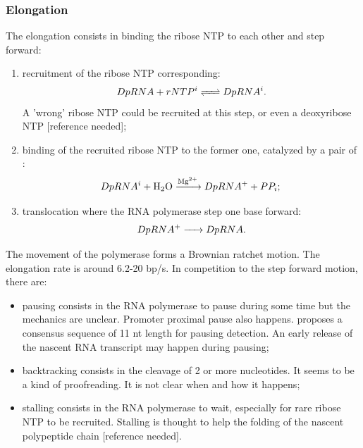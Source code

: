 \subsubsection{Elongation}
The elongation consists in binding the ribose NTP to each other and step forward:
\begin{enumerate}
  \item recruitment of the ribose NTP corresponding:
    $$
      \reactionRev{DpRNA + rNTP^i}{DpRNA^i}{}{} . \\
    $$
    A 'wrong' ribose NTP could be recruited at this step, or even a deoxyribose NTP [reference needed];
  \item binding of the recruited ribose NTP to the former one, catalyzed by a pair of :
    $$
      \reactionIrr{DpRNA^i + \ce{H2O}}{DpRNA^+ + PP_i}{\ce{Mg^2+}}{} ; \\
    $$
  \item translocation where the RNA polymerase step one base forward:
    $$
      \reactionIrr{DpRNA^+}{DpRNA}{}{} . \\
    $$
\end{enumerate}
The movement of the polymerase forms a Brownian ratchet motion. The elongation rate is around 6.2-20 bp/s. In competition to the step forward motion, there are:
\begin{itemize}
  \item pausing consists in the RNA polymerase to pause during some time but the mechanics are unclear. Promoter proximal pause also happens. \citep{LaW+:14} proposes a consensus sequence of 11 nt length for pausing detection. An early release of the nascent RNA transcript may happen during pausing;
  \item backtracking consists in the cleavage of 2 or more nucleotides. It seems to be a kind of proofreading. It is not clear when and how it happens;
  \item stalling consists in the RNA polymerase to wait, especially for rare ribose NTP to be recruited. Stalling is thought to help the folding of the nascent polypeptide chain [reference needed].
\end{itemize}






